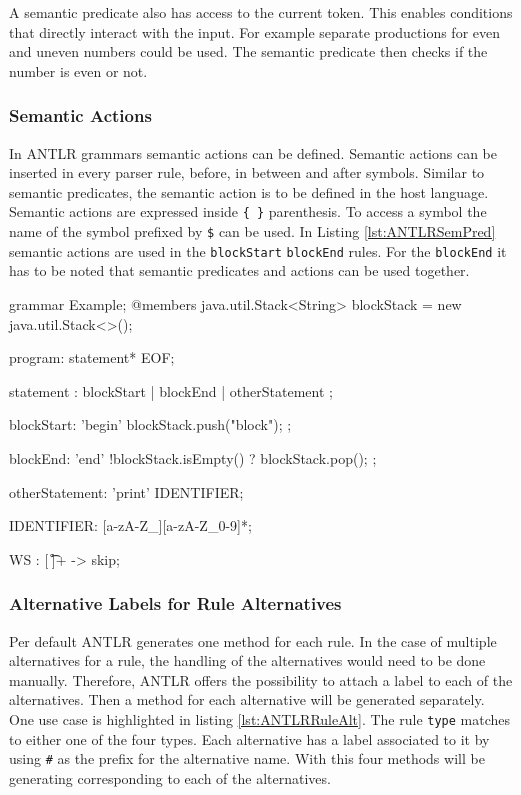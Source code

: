 A semantic predicate also has access to the current token. This enables conditions that directly interact with the input. For example separate productions for even and uneven numbers could be used. The semantic predicate then checks if the number is even or not.  


\subsubsection{Semantic Actions}

In ANTLR grammars semantic actions can be defined. Semantic actions can be inserted in every parser rule, before, in between and after symbols. Similar to semantic predicates, the semantic action is to be defined in the host language. Semantic actions are expressed inside \verb|{ }| parenthesis. To access a symbol the name of the symbol prefixed by \verb|$| can be used. In Listing \ref{lst:ANTLRSemPred} semantic actions are used in the \texttt{blockStart} \texttt{blockEnd} rules. For the \texttt{blockEnd} it has to be noted that semantic predicates and actions can be used together. 


\begin{GenericCode}[float,numbers=none,caption=Example grammar using a semantic predicate and a semantic action., label=lst:ANTLRSemPred]
grammar Example;
@members {
    java.util.Stack<String> blockStack = new java.util.Stack<>();
}

program: statement* EOF;

statement
    : blockStart
    | blockEnd
    | otherStatement
    ;

blockStart: 'begin' { blockStack.push("block"); };

blockEnd: 'end' { !blockStack.isEmpty() }? { blockStack.pop(); };

otherStatement: 'print' IDENTIFIER;

IDENTIFIER: [a-zA-Z_][a-zA-Z_0-9]*;

WS  : [ \t\r\n]+ -> skip;
\end{GenericCode}


\subsubsection{Alternative Labels for Rule Alternatives}

Per default ANTLR generates one method for each rule. In the case of multiple alternatives for a rule, the handling of the alternatives would need to be done manually. Therefore, ANTLR offers the possibility to attach a label to each of the alternatives. Then a method for each alternative will be generated separately. One use case is highlighted in listing \ref{lst:ANTLRRuleAlt}. The rule \texttt{type} matches to either one of the four types. Each alternative has a label associated to it by using \verb|#| as the prefix for the alternative name. With this four methods will be generating corresponding to each of the alternatives.     

